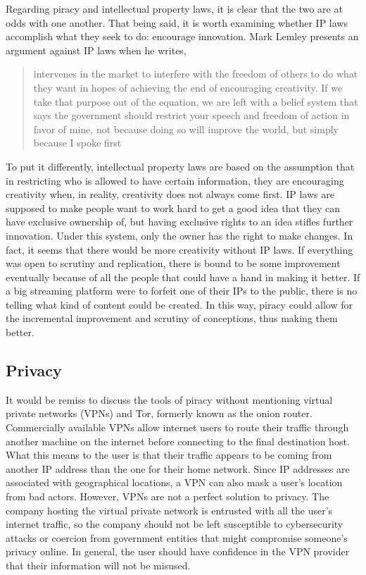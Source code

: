 \documentclass[onecolumn, 12pt]{article}
\begin{document}
\begin{refsection}
Regarding piracy and intellectual property laws, it is clear that the two are at odds with
one another. That being said, it is worth examining whether IP laws accomplish what they
seek to do: encourage innovation. Mark Lemley presents an argument against IP laws when he
writes, \blockcquote[1339]{lemley:faith-based}[.]{%
   intervenes in the market to interfere with the freedom of others
  to do what they want in hopes of achieving the end of encouraging creativity.
  If we take that purpose out of the equation, we are left with a belief system
  that says the government should restrict your speech and freedom of action in
  favor of mine, not because doing so will improve the world, but simply because
  I spoke first%
}
To put it differently, intellectual property laws are based on the assumption that in
restricting who is allowed to have certain information, they are encouraging creativity
when, in reality, creativity does not always come first. IP laws are supposed to make
people want to work hard to get a good idea that they can have exclusive ownership of, but
having exclusive rights to an idea stifles further innovation. Under this system, only the
owner has the right to make changes. In fact, it seems that there would be more creativity
without IP laws. If everything was open to scrutiny and replication, there is bound to be
some improvement eventually because of all the people that could have a hand in making it
better. If a big streaming platform were to forfeit one of their IPs to the public, there
is no telling what kind of content could be created. In this way, piracy could allow for
the incremental improvement and scrutiny of conceptions, thus making them better.

\subsection{Privacy}
It would be remiss to discuss the tools of piracy without mentioning virtual private
networks (VPNs) and Tor, formerly known as the onion router. Commercially available VPNs
allow internet users to route their traffic through another machine on the internet before
connecting to the final destination host. What this means to the user is that their
traffic appears to be coming from another IP address than the one for their home network.
Since IP addresses are associated with geographical locations, a VPN can also mask a
user's location from bad actors. However, VPNs are not a perfect solution to privacy. The
company hosting the virtual private network is entrusted with all the user's internet
traffic, so the company should not be left susceptible to cybersecurity attacks or
coercion from government entities that might compromise someone's privacy online. In
general, the user should have confidence in the VPN provider that their information will
not be misused.


\end{refsection}
\end{document}
